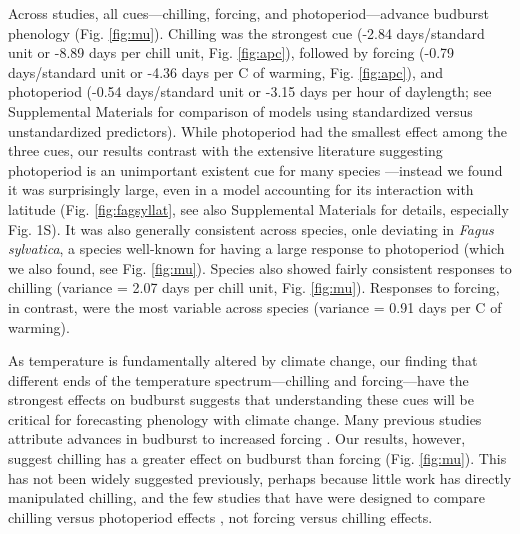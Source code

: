 \documentclass{article}
\begin{document}
\par Across studies, all cues---chilling, forcing, and photoperiod---advance budburst phenology (Fig. \ref {fig:mu}). Chilling was the strongest cue (-2.84 days/standard unit or -8.89 days per chill unit, Fig. \ref {fig:apc}), followed by forcing (-0.79 days/standard unit or -4.36 days per \degree C of warming, Fig. \ref {fig:apc}), and photoperiod (-0.54 days/standard unit or -3.15 days per hour of daylength; see Supplemental Materials for comparison of models using standardized versus unstandardized predictors). While photoperiod had the smallest effect among the three cues, our results contrast with the extensive literature suggesting photoperiod is an unimportant existent cue for many species \citep{zohner2016,koerner2010a}---instead we found it was surprisingly large, even in a model accounting for its interaction with latitude (Fig. \ref {fig:fagsyllat}, see also Supplemental Materials for details, especially Fig. 1S). It was also generally consistent across species, onle deviating in  \emph{Fagus sylvatica}, a species well-known for having a large response to photoperiod (which we also found, see Fig. \ref {fig:mu}). Species also showed fairly consistent responses to chilling (variance = 2.07 days per chill unit, Fig. \ref {fig:mu}).
Responses to forcing, in contrast, were the most variable across species (variance = 0.91 days per \degree C of warming).

\par As temperature is fundamentally altered by climate change, our finding that different ends of the temperature spectrum---chilling and forcing---have the strongest effects on budburst suggests that understanding these cues will be critical for forecasting phenology with climate change. Many previous studies attribute advances in budburst to increased forcing \citep{Basler:2014aa,bradley1999,menzel2006,harrington2015}. %
Our results, however, suggest chilling has a greater effect on budburst than forcing (Fig. \ref{fig:mu}). This has not been widely suggested previously, perhaps because little work has directly manipulated chilling, and the few studies that have were designed to compare chilling versus photoperiod effects \citep[e.g., ][]{Basler:2014aa,Caffarra:2011qf,Laube:2014a,zohner2016}, not forcing versus chilling effects. 
\end{document}
